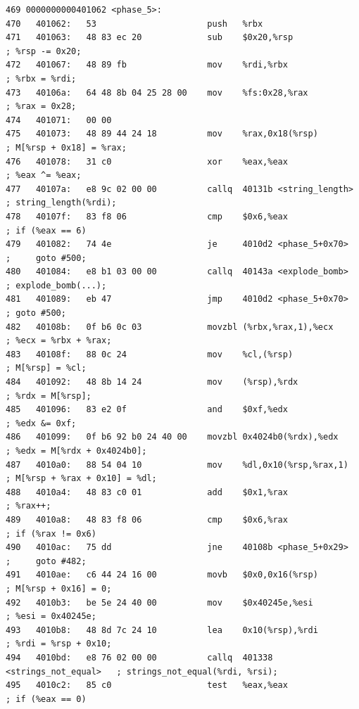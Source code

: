 \documentclass{article}
\begin{document}
\begin{lstlisting}[title = phase\_5对应的反汇编代码及注释, xleftmargin = 2em,xrightmargin = 2em, aboveskip = 1em, numbers = none, basicstyle=\footnotesize\ttfamily]
469 0000000000401062 <phase_5>:
470   401062:   53                      push   %rbx
471   401063:   48 83 ec 20             sub    $0x20,%rsp                   ; %rsp -= 0x20;
472   401067:   48 89 fb                mov    %rdi,%rbx                    ; %rbx = %rdi;
473   40106a:   64 48 8b 04 25 28 00    mov    %fs:0x28,%rax                ; %rax = 0x28;
474   401071:   00 00
475   401073:   48 89 44 24 18          mov    %rax,0x18(%rsp)              ; M[%rsp + 0x18] = %rax;
476   401078:   31 c0                   xor    %eax,%eax                    ; %eax ^= %eax;
477   40107a:   e8 9c 02 00 00          callq  40131b <string_length>       ; string_length(%rdi);
478   40107f:   83 f8 06                cmp    $0x6,%eax                    ; if (%eax == 6)
479   401082:   74 4e                   je     4010d2 <phase_5+0x70>        ;     goto #500;
480   401084:   e8 b1 03 00 00          callq  40143a <explode_bomb>        ; explode_bomb(...);
481   401089:   eb 47                   jmp    4010d2 <phase_5+0x70>        ; goto #500;
482   40108b:   0f b6 0c 03             movzbl (%rbx,%rax,1),%ecx           ; %ecx = %rbx + %rax;
483   40108f:   88 0c 24                mov    %cl,(%rsp)                   ; M[%rsp] = %cl;
484   401092:   48 8b 14 24             mov    (%rsp),%rdx                  ; %rdx = M[%rsp];
485   401096:   83 e2 0f                and    $0xf,%edx                    ; %edx &= 0xf;
486   401099:   0f b6 92 b0 24 40 00    movzbl 0x4024b0(%rdx),%edx          ; %edx = M[%rdx + 0x4024b0];
487   4010a0:   88 54 04 10             mov    %dl,0x10(%rsp,%rax,1)        ; M[%rsp + %rax + 0x10] = %dl;
488   4010a4:   48 83 c0 01             add    $0x1,%rax                    ; %rax++;
489   4010a8:   48 83 f8 06             cmp    $0x6,%rax                    ; if (%rax != 0x6)
490   4010ac:   75 dd                   jne    40108b <phase_5+0x29>        ;     goto #482;
491   4010ae:   c6 44 24 16 00          movb   $0x0,0x16(%rsp)              ; M[%rsp + 0x16] = 0;
492   4010b3:   be 5e 24 40 00          mov    $0x40245e,%esi               ; %esi = 0x40245e;
493   4010b8:   48 8d 7c 24 10          lea    0x10(%rsp),%rdi              ; %rdi = %rsp + 0x10;
494   4010bd:   e8 76 02 00 00          callq  401338 <strings_not_equal>   ; strings_not_equal(%rdi, %rsi);
495   4010c2:   85 c0                   test   %eax,%eax                    ; if (%eax == 0)

\end{lstlisting}
\end{document}
